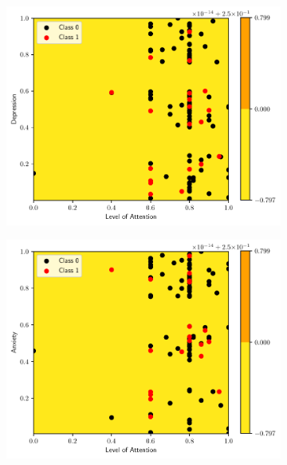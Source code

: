 \begin{figure}
    \centering
    \begin{subfigure}[b]{0.32\textwidth}
        \centering
        \includegraphics[width=\textwidth]{figs/tree-contour-0-3.pdf}
        \caption{}
    \end{subfigure}
    \begin{subfigure}[b]{0.32\textwidth}
        \centering
        \includegraphics[width=\textwidth]{figs/tree-contour-0-4.pdf}
        \caption{}
    \end{subfigure}
    \begin{subfigure}[b]{0.32\textwidth}

\end{subfigure}
\end{figure}
